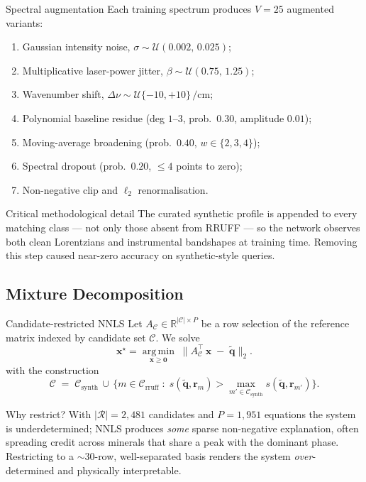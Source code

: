\documentclass[10pt,aspectratio=169,xcolor=dvipsnames]{beamer}
\newcommand{\cmone}{\si{\per\centi\meter}}
\begin{document}
\begin{frame}{Spectral augmentation}
  Each training spectrum produces $V = 25$ augmented variants:
  \begin{enumerate}\setlength\itemsep{0.15em}
    \item Gaussian intensity noise, $\sigma \sim \mathcal{U}(0.002,\,0.025)$;
    \item Multiplicative laser-power jitter, $\beta \sim \mathcal{U}(0.75,\,1.25)$;
    \item Wavenumber shift, $\Delta\nu \sim \mathcal{U}\{-10, +10\}\,\cmone$;
    \item Polynomial baseline residue (deg $1$–$3$, prob.\ $0.30$, amplitude $0.01$);
    \item Moving-average broadening (prob.\ $0.40$, $w \in \{2,3,4\}$);
    \item Spectral dropout (prob.\ $0.20$, $\leq 4$ points to zero);
    \item Non-negative clip and $\ell_2$ renormalisation.
  \end{enumerate}
  \medskip
  \begin{block}{Critical methodological detail}
  The curated synthetic profile is appended to \alert{every} matching class —
  not only those absent from RRUFF — so the network observes both clean
  Lorentzians and instrumental bandshapes at training time. Removing this
  step caused \alert{near-zero accuracy on synthetic-style queries}.
  \end{block}
\end{frame}

\subsection{Mixture Decomposition}

\begin{frame}{Candidate-restricted NNLS}
  Let $A_{\mathcal{C}} \in \mathbb{R}^{|\mathcal{C}| \times P}$ be a row
  selection of the reference matrix indexed by candidate set $\mathcal{C}$.
  We solve
  \[
    \mathbf{x}^{\star}
      = \operatorname*{arg\,min}_{\mathbf{x} \geq \mathbf{0}}
        \;\bigl\| A_{\mathcal{C}}^{\top}\,\mathbf{x} \;-\; \tilde{\mathbf{q}} \bigr\|_{2}.
  \]
  with the construction
  \[
    \mathcal{C} \;=\; \mathcal{C}_{\text{synth}}
      \,\cup\, \bigl\{ m \in \mathcal{C}_{\text{rruff}} \;:\;
                       s(\tilde{\mathbf{q}}, \mathbf{r}_m)
                       > \max_{m' \in \mathcal{C}_{\text{synth}}}
                         s(\tilde{\mathbf{q}}, \mathbf{r}_{m'}) \bigr\}.
  \]
  \begin{block}{Why restrict?}
    With $|\mathcal{R}| = 2{,}481$ candidates and $P = 1{,}951$ equations
    the system is \alert{underdetermined}; NNLS produces \emph{some}
    sparse non-negative explanation, often spreading credit across
    minerals that share a peak with the dominant phase. Restricting to
    a $\sim 30$-row, well-separated basis renders the system
    \emph{over}-determined and physically interpretable.
  \end{block}
\end{frame}
\end{document}
